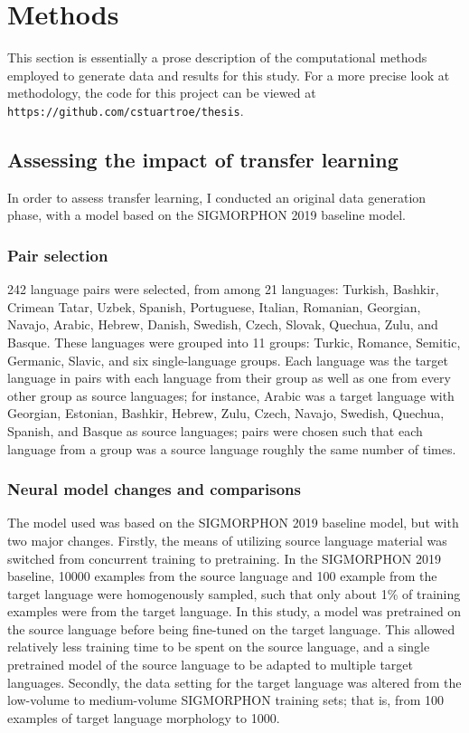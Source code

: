 \chapter{Methods}

This section is essentially a prose description of the computational methods employed to generate data and results for this study. For a more precise look at methodology, the code for this project can be viewed at \texttt{https://github.com/cstuartroe/thesis}.

\section{Assessing the impact of transfer learning}

In order to assess transfer learning, I conducted an original data generation phase, with a model based on the SIGMORPHON 2019 baseline model. 

\subsection{Pair selection}

242 language pairs were selected, from among 21 languages: Turkish, Bashkir, Crimean Tatar, Uzbek, Spanish, Portuguese, Italian, Romanian, Georgian, Navajo, Arabic, Hebrew, Danish, Swedish, Czech, Slovak, Quechua, Zulu, and Basque. These languages were grouped into 11 groups: Turkic, Romance, Semitic, Germanic, Slavic, and six single-language groups. Each language was the target language in pairs with each language from their group as well as one from every other group as source languages; for instance, Arabic was a target language with Georgian, Estonian, Bashkir, Hebrew, Zulu, Czech, Navajo, Swedish, Quechua, Spanish, and Basque as source languages; pairs were chosen such that each language from a group was a source language roughly the same number of times.

\subsection{Neural model changes and comparisons}

The model used was based on the SIGMORPHON 2019 baseline model, but with two major changes. Firstly, the means of utilizing source language material was switched from concurrent training to pretraining. In the SIGMORPHON 2019 baseline, 10000 examples from the source language and 100 example from the target language were homogenously sampled, such that only about 1\% of training examples were from the target language. In this study, a model was pretrained on the source language before being fine-tuned on the target language. This allowed relatively less training time to be spent on the source language, and a single pretrained model of the source language to be adapted to multiple target languages. Secondly, the data setting for the target language was altered from the low-volume to medium-volume SIGMORPHON training sets; that is, from 100 examples of target language morphology to 1000.

